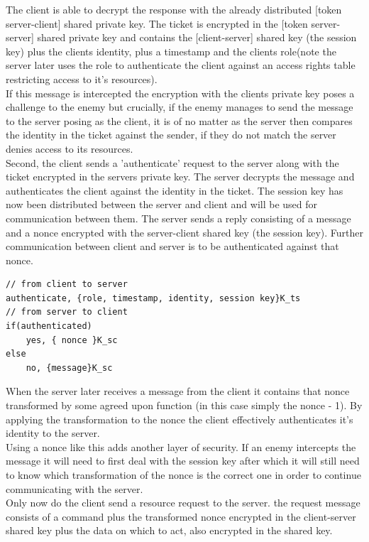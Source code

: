 The client is able to decrypt the response with the already distributed [token server-client] shared private key. The ticket is encrypted in the [token server-server] shared private key and contains the [client-server] shared key (the session key) plus the clients identity, plus a timestamp and the clients role(note the server later uses the role to authenticate the client against an access rights table restricting access to it's resources). \\ 

If this message is intercepted the encryption with the clients private key poses a challenge to the enemy but crucially, if the enemy manages to send the message to the server posing as the client, it is of no matter as the server then compares the identity in the ticket against the sender, if they do not match the server denies access to its resources.\\

Second, the client sends a 'authenticate' request to the server along with the ticket encrypted in the servers private key. The server decrypts the message and authenticates the client against the identity in the ticket. The session key has now been distributed between the server and client and will be used for communication between them. The server sends a reply consisting of a message and a nonce encrypted with the server-client shared key (the session key). Further communication between client and server is to be authenticated  against that nonce.
\begin{lstlisting}
// from client to server
authenticate, {role, timestamp, identity, session key}K_ts 
// from server to client
if(authenticated)
	yes, { nonce }K_sc
else
	no, {message}K_sc
\end{lstlisting}

When the server later receives a message from the client it contains that nonce transformed by some agreed upon function (in this case simply the nonce - 1). By applying the transformation to the nonce the client effectively authenticates it's identity to the server. \\

Using a nonce like this adds another layer of security. If an enemy intercepts the message it will need to first deal with the session key after which it will still need to know which transformation of the nonce is the correct one in order to continue communicating with the server. \\

Only now do the client send a resource request to the server. the request message consists of a command plus the transformed nonce encrypted in the client-server shared key plus the data on which to act, also encrypted in the shared key. \\

